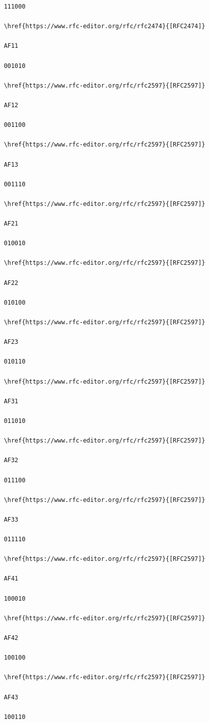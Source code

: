 \begin{verbatim}
    111000
    
    \href{https://www.rfc-editor.org/rfc/rfc2474}{[RFC2474]}
    
    AF11
    
    001010
    
    \href{https://www.rfc-editor.org/rfc/rfc2597}{[RFC2597]}
    
    AF12
    
    001100
    
    \href{https://www.rfc-editor.org/rfc/rfc2597}{[RFC2597]}
    
    AF13
    
    001110
    
    \href{https://www.rfc-editor.org/rfc/rfc2597}{[RFC2597]}
    
    AF21
    
    010010
    
    \href{https://www.rfc-editor.org/rfc/rfc2597}{[RFC2597]}
    
    AF22
    
    010100
    
    \href{https://www.rfc-editor.org/rfc/rfc2597}{[RFC2597]}
    
    AF23
    
    010110
    
    \href{https://www.rfc-editor.org/rfc/rfc2597}{[RFC2597]}
    
    AF31
    
    011010
    
    \href{https://www.rfc-editor.org/rfc/rfc2597}{[RFC2597]}
    
    AF32
    
    011100
    
    \href{https://www.rfc-editor.org/rfc/rfc2597}{[RFC2597]}
    
    AF33
    
    011110
    
    \href{https://www.rfc-editor.org/rfc/rfc2597}{[RFC2597]}
    
    AF41
    
    100010
    
    \href{https://www.rfc-editor.org/rfc/rfc2597}{[RFC2597]}
    
    AF42
    
    100100
    
    \href{https://www.rfc-editor.org/rfc/rfc2597}{[RFC2597]}
    
    AF43
    
    100110
    

\end{verbatim}
